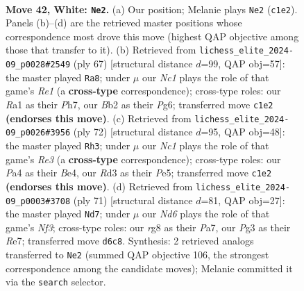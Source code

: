 \documentclass[11pt]{article}
\begin{document}
\clearpage

\begin{figure}[p]\centering
\begin{subfigure}{0.46\textwidth}\centering
\resizebox{\linewidth}{!}{%
\newchessgame
\chessboard[
  setfen={r2bb1r1/1p5p/n1kN2pP/p3Pp2/P2p4/3R2P1/1B5K/R1N5 w - - 8 42},
  showmover=false,
  pgfstyle=straightmove, color=movearrow, markmove={c1-e2}
]}
\caption{}
\end{subfigure}\hfill
\begin{subfigure}{0.46\textwidth}\centering
\resizebox{\linewidth}{!}{%
\newchessgame
\chessboard[
  setfen={4r1k1/5p1p/6p1/2p1r3/1pPnP3/1P1R1B1P/6P1/1R5K b - - 0 34},
  showmover=false,
  pgfstyle=straightmove, color=movearrow, markmove={e8-a8}
]}
\caption{}
\end{subfigure}
\\[4pt]
\begin{subfigure}{0.46\textwidth}\centering
\resizebox{\linewidth}{!}{%
\newchessgame
\chessboard[
  setfen={1r3k2/p1br1p2/4b1pp/2pNP3/2P1BPP1/4R3/P5R1/6K1 w - - 15 37},
  showmover=false,
  pgfstyle=straightmove, color=movearrow, markmove={e3-h3}
]}
\caption{}
\end{subfigure}\hfill
\begin{subfigure}{0.46\textwidth}\centering
\resizebox{\linewidth}{!}{%
\newchessgame
\chessboard[
  setfen={2r5/pp2rpp1/3k1n1p/P2P4/2B2RPP/1P3P2/R4K2/8 b - - 0 36},
  showmover=false,
  pgfstyle=straightmove, color=movearrow, markmove={f6-d7}
]}
\caption{}
\end{subfigure}
\caption{\textbf{Move 42, White: \texttt{Ne2}.} (a) Our position; Melanie plays \texttt{Ne2} (\texttt{c1e2}). Panels (b)--(d) are the retrieved master positions whose correspondence most drove this move (highest QAP objective among those that transfer to it). (b) Retrieved from \texttt{lichess\_elite\_2024-09\_p0028\#2549} (ply 67) [structural distance $d$=99, QAP obj=57]: the master played \texttt{Ra8}; under $\mu$ our \emph{Nc1} plays the role of that game's \emph{Re1} (a \textbf{cross-type} correspondence); cross-type roles: our \emph{R}a1 as their \emph{P}h7, our \emph{B}b2 as their \emph{P}g6; transferred move \texttt{c1e2} \textbf{(endorses this move)}. (c) Retrieved from \texttt{lichess\_elite\_2024-09\_p0026\#3956} (ply 72) [structural distance $d$=95, QAP obj=48]: the master played \texttt{Rh3}; under $\mu$ our \emph{Nc1} plays the role of that game's \emph{Re3} (a \textbf{cross-type} correspondence); cross-type roles: our \emph{P}a4 as their \emph{B}e4, our \emph{R}d3 as their \emph{P}e5; transferred move \texttt{c1e2} \textbf{(endorses this move)}. (d) Retrieved from \texttt{lichess\_elite\_2024-09\_p0003\#3708} (ply 71) [structural distance $d$=81, QAP obj=27]: the master played \texttt{Nd7}; under $\mu$ our \emph{Nd6} plays the role of that game's \emph{Nf3}; cross-type roles: our \emph{r}g8 as their \emph{P}a7, our \emph{P}g3 as their \emph{R}e7; transferred move \texttt{d6c8}. Synthesis: 2 retrieved analogs transferred to \texttt{Ne2} (summed QAP objective 106, the strongest correspondence among the candidate moves); Melanie committed it via the \texttt{search} selector.}
\label{fig:thought-m82}
\end{figure}
\end{document}
